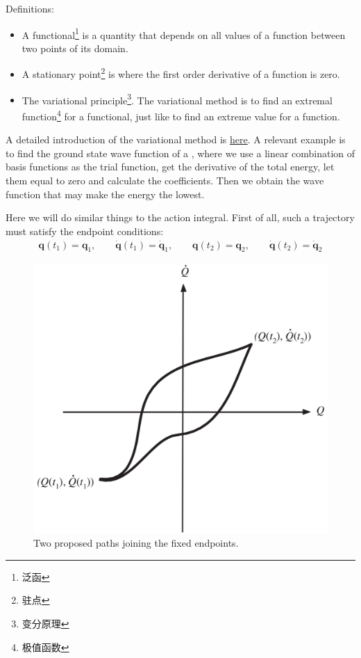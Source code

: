 \documentclass[
  10pt,
  twoside,
  openany,
  b5paper, %
  colorscheme = bootstrap-v4, %
]{qyxf-book}
\numberwithin{equation}{section}
\newcommand{\vq}{\boldsymbol{q}}
\newcommand{\dvq}{\dot{\vq}}
\begin{document}
\begin{tcolorbox}[colback=\TheoremBackground,colframe=\TheoremFrame,coltext=\TheoremColor]
	Definitions:
	\begin{itemize}
		\item A functional\footnote{泛函} is a quantity that depends on all values of a function between two points of its domain.
		\item A stationary point\footnote{驻点} is where the first order derivative of a function is zero.
		\item The variational principle\footnote{变分原理}. The variational method is to find an extremal function\footnote{极值函数} for a functional, just like to find an extreme value for a function.
	\end{itemize}
	A detailed introduction of the variational method is \href{https://zhuanlan.zhihu.com/p/139018146}{here}. A relevant example is to find the ground state wave function of a , where we use a linear combination of basis functions as the trial function, get the derivative of the total energy, let them equal to zero and calculate the coefficients. Then we obtain the wave function that may make the energy the lowest.
\end{tcolorbox}

Here we will do similar things to the action integral. 
First of all, such a trajectory must satisfy the endpoint conditions:
\begin{gather}
	\vq(t_1)=\vq_1,\qquad \dvq(t_1)=\dvq_1,\qquad \vq(t_2)=\vq_2,\qquad \dvq(t_2)=\dvq_2
\end{gather}

\begin{figure}[htbp]
	\centering
	\includegraphics[width=0.6\linewidth]{figure/1-8-qt}
	\caption{Two proposed paths joining the fixed endpoints.}
	\label{fig:1-8-qt}
\end{figure}
\end{document}
